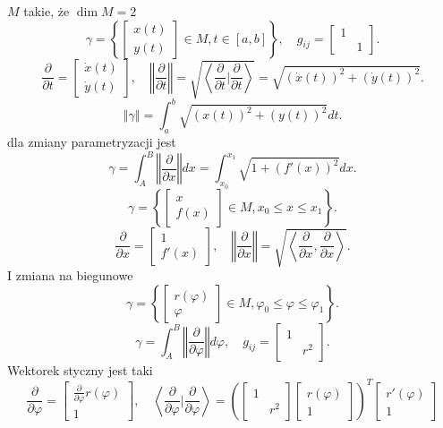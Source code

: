 \documentclass[../main.tex]{subfiles}
\begin{document}
\begin{przyklad}
$M$ takie, że $\dim M = 2$
 \[
     \gamma = \left\{ \begin{bmatrix} x(t)\\y(t) \end{bmatrix} \in M, t\in[a,b] \right\},\quad g_{ij} = \begin{bmatrix} 1&\\&1 \end{bmatrix}
.\]
\[
    \frac{\partial }{\partial t} = \begin{bmatrix} \dot{x}(t)\\ \dot{y}(t)\end{bmatrix},\quad \left\Vert \frac{\partial }{\partial t}  \right\Vert = \sqrt{\left<\frac{\partial }{\partial t} \Bigg| \frac{\partial }{\partial t}  \right>} = \sqrt{\left( \dot{x}(t) \right) ^2 + \left( \dot{y}(t) \right) ^2}
.\]
\[
    \left\Vert \gamma \right\Vert = \int_a^b \sqrt{\left( x(t) \right) ^2 + \left( y(t) \right) ^2}dt
.\]
dla zmiany parametryzacji jest
\[
    \gamma = \int_A^B \left\Vert \frac{\partial }{\partial x}  \right\Vert dx = \int_{x_0}^{x_1}\sqrt{1 + \left( f'(x) \right) ^2} dx
.\]
\[
    \gamma = \left\{ \begin{bmatrix} x\\ f(x) \end{bmatrix} \in M, x_0 \le x \le x_1 \right\}
.\]
\[
    \frac{\partial }{\partial x} = \begin{bmatrix} 1\\ f'(x) \end{bmatrix},\quad \left\Vert \frac{\partial }{\partial x}  \right\Vert = \sqrt{\left<\frac{\partial }{\partial x} , \frac{\partial }{\partial x}  \right>}
.\]
I zmiana na biegunowe
\[
    \gamma = \left\{ \begin{bmatrix} r(\varphi)\\ \varphi \end{bmatrix} \in M, \varphi_0\le\varphi\le\varphi_1 \right\}
.\]
\[
    \gamma = \int_A^B \left\Vert \frac{\partial }{\partial \varphi}  \right\Vert d\varphi,\quad g_{ij} = \begin{bmatrix} 1&\\&r^2 \end{bmatrix}
.\]
Wektorek styczny jest taki
\[
    \frac{\partial }{\partial \varphi}  = \begin{bmatrix} \frac{\partial }{\partial \varphi} r(\varphi)\\ 1 \end{bmatrix},\quad \left<\frac{\partial }{\partial \varphi} | \frac{\partial }{\partial \varphi}  \right> = \left( \begin{bmatrix} 1&\\&r^2 \end{bmatrix} \begin{bmatrix} r(\varphi)\\ 1 \end{bmatrix}  \right) ^T \begin{bmatrix} r'(\varphi) \\ 1 \end{bmatrix}
\]
\end{przyklad}
\end{document}

